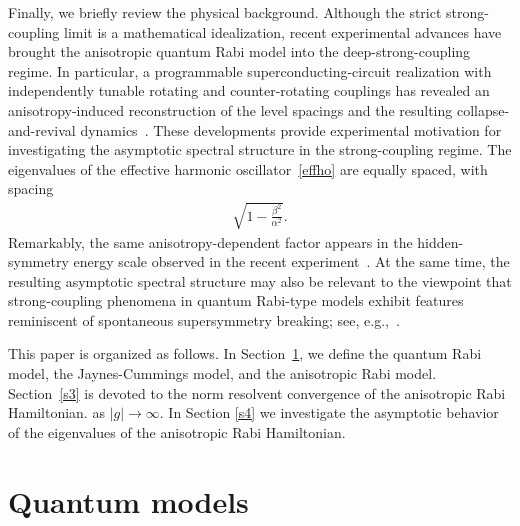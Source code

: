\documentclass[12pt,dvipdfmx]{article}
\begin{document}
Finally, we briefly review the physical background. Although the strict 
strong-coupling limit is a mathematical idealization, recent experimental 
advances have brought the anisotropic quantum Rabi model into the 
deep-strong-coupling regime. In particular, a programmable 
superconducting-circuit realization with independently tunable rotating 
and counter-rotating couplings has revealed an anisotropy-induced 
reconstruction of the level spacings and the resulting 
collapse-and-revival dynamics~\cite{Song26}. These developments provide 
experimental motivation for investigating the asymptotic spectral 
structure in the strong-coupling regime.
The eigenvalues of the effective harmonic oscillator~\eqref{effho} are 
equally spaced, with spacing
\begin{align*}
    \sqrt{1-\frac{\beta^2}{\alpha^2}}.
\end{align*}
Remarkably, the same anisotropy-dependent factor appears in the 
hidden-symmetry energy scale observed in the recent 
experiment~\cite{Song26}.
At the same time, the resulting 
asymptotic spectral structure may also be relevant to the viewpoint that 
strong-coupling phenomena in quantum Rabi-type models exhibit features 
reminiscent of spontaneous supersymmetry breaking; see, 
e.g.,~\cite{bcbs16,Hirokawa15,Hirokawa24,Hirokawa25,TPG15,
CWMZJYHZD22,KMMR24}.




This paper is organized as follows. In Section~\ref{s2}, we define the quantum Rabi model,
the Jaynes-Cummings model, and the anisotropic Rabi model.
Section~\ref{s3} is devoted to the norm resolvent convergence of the anisotropic Rabi Hamiltonian. 
as $|g|\to\infty$. 
In Section \ref{s4} we investigate the asymptotic behavior of the eigenvalues of the anisotropic Rabi Hamiltonian.
%
%
%
\section{Quantum models}\label{s2}
%
%
%
\end{document}
